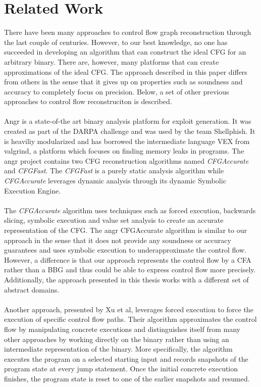 \documentclass{kththesis}
\newcommand{\fbcomment}[1]{{#1}}
\renewcommand{\fbcomment}[1]{}
\begin{document}
\section{Related Work}
\fbcomment{\color{red}Goal:Describe what has and hasn't been done in related work. Also, how the earlier work relates to what has been done in this thesis}
There have been many approaches to control flow graph reconstruction through the last couple of centuries. However, to our best knowledge, no one has succeeded in developing an algorithm that can construct the ideal CFG for an arbitrary binary. There are, however, many platforms that can create approximations of the ideal CFG. The approach described in this paper differs from others in the sense that it gives up on properties such as soundness and accuracy to completely focus on precision. Below, a set of other previous approaches to control flow reconstruciton is described.
\\ \\
Angr\cite{angr} is a state-of-the art binary analysis platform for exploit generation. It was created as part of the DARPA challenge and was used by the team Shellphish. It is heaviliy modularized and has borrowed the intermediate language VEX from valgrind, a platform which focuses on finding memory leaks in programs. The angr project contains two CFG reconstruction algorithms named \textit{CFGAccurate} and \textit{CFGFast}. The \textit{CFGFast} is a purely static analysis algorithm while \textit{CFGAccurate} leverages dynamic analysis through its dynamic Symbolic Execution Engine. 
\\ \\
The \textit{CFGAccurate} algorithm uses techniques such as forced execution, backwards slicing, symbolic execution and value set analysis to create an accurate representation of the CFG. The angr CFGAccurate algorithm is similar to our approach in the sense that it does not provide any soundness or accuracy guarantees and uses symbolic execution to underapproximate the control flow. However, a difference is that our approach represents the control flow by a CFA rather than a BBG and thus could be able to express control flow more precisely. Additionally, the approach presented in this thesis works with a different set of abstract domains.
\\ \\
Another approach, presented by Xu et al\cite{preciseCFG}, leverages forced execution to force the execution of specific control flow paths. Their algorithm approximates the control flow by manipulating concrete executions and distinguishes itself from many other approaches by working directly on the binary rather than using an intermediate representation of the binary. More specifically, the algorithm executes the program on a selected starting input and records snapshots of the program state at every jump statement. Once the initial concrete execution finishes, the program state is reset to one of the earlier snapshots and resumed. 
\end{document}
